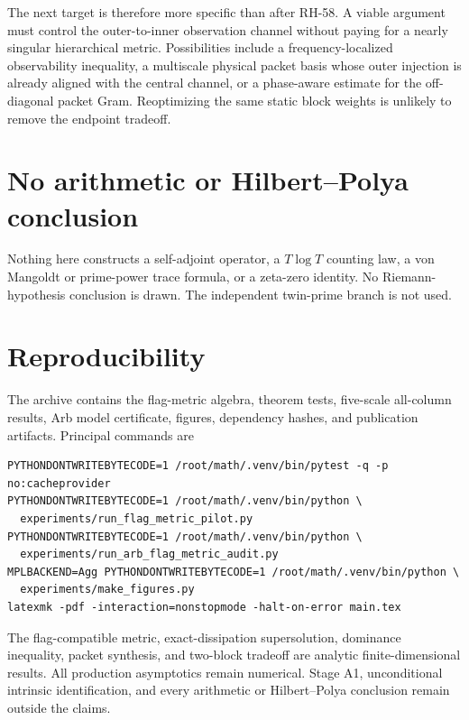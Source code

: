 \documentclass[11pt]{article}
\theoremstyle{remark}
\begin{document}
The next target is therefore more specific than after RH-58.  A viable
argument must control the outer-to-inner observation channel without paying
for a nearly singular hierarchical metric.  Possibilities include a
frequency-localized observability inequality, a multiscale physical packet
basis whose outer injection is already aligned with the central channel, or
a phase-aware estimate for the off-diagonal packet Gram.  Reoptimizing the
same static block weights is unlikely to remove the endpoint tradeoff.

\section{No arithmetic or Hilbert--Polya conclusion}

Nothing here constructs a self-adjoint operator, a $T\log T$ counting law, a
von Mangoldt or prime-power trace formula, or a zeta-zero identity.  No
Riemann-hypothesis conclusion is drawn.  The independent twin-prime branch is
not used.

\section{Reproducibility}

The archive contains the flag-metric algebra, theorem tests, five-scale
all-column results, Arb model certificate, figures, dependency hashes, and
publication artifacts.  Principal commands are
\begin{verbatim}
PYTHONDONTWRITEBYTECODE=1 /root/math/.venv/bin/pytest -q -p no:cacheprovider
PYTHONDONTWRITEBYTECODE=1 /root/math/.venv/bin/python \
  experiments/run_flag_metric_pilot.py
PYTHONDONTWRITEBYTECODE=1 /root/math/.venv/bin/python \
  experiments/run_arb_flag_metric_audit.py
MPLBACKEND=Agg PYTHONDONTWRITEBYTECODE=1 /root/math/.venv/bin/python \
  experiments/make_figures.py
latexmk -pdf -interaction=nonstopmode -halt-on-error main.tex
\end{verbatim}

The flag-compatible metric, exact-dissipation supersolution, dominance
inequality, packet synthesis, and two-block tradeoff are analytic
finite-dimensional results.  All production asymptotics remain numerical.
Stage A1, unconditional intrinsic identification, and every arithmetic or
Hilbert--Polya conclusion remain outside the claims.



\end{document}
